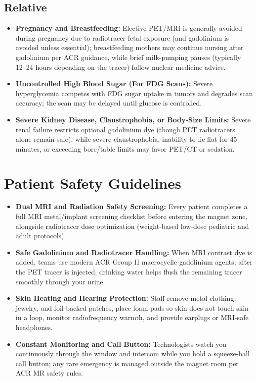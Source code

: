 \subsection{Relative}
\begin{itemize}
\item \textbf{Pregnancy and Breastfeeding:} Elective PET/MRI is generally avoided during pregnancy due to radiotracer fetal exposure (and gadolinium is avoided unless essential); breastfeeding mothers may continue nursing after gadolinium per ACR guidance, while brief milk-pumping pauses (typically 12--24 hours depending on the tracer) follow nuclear medicine advice.
\item \textbf{Uncontrolled High Blood Sugar (For FDG Scans):} Severe hyperglycemia competes with FDG sugar uptake in tumors and degrades scan accuracy; the scan may be delayed until glucose is controlled.
\item \textbf{Severe Kidney Disease, Claustrophobia, or Body-Size Limits:} Severe renal failure restricts optional gadolinium dye (though PET radiotracers alone remain safe), while severe claustrophobia, inability to lie flat for 45 minutes, or exceeding bore/table limits may favor PET/CT or sedation.
\end{itemize}

\section{Patient Safety Guidelines}
\begin{itemize}
\item \textbf{Dual MRI and Radiation Safety Screening:} Every patient completes a full MRI metal/implant screening checklist before entering the magnet zone, alongside radiotracer dose optimization (weight-based low-dose pediatric and adult protocols).
\item \textbf{Safe Gadolinium and Radiotracer Handling:} When MRI contrast dye is added, teams use modern ACR Group II macrocyclic gadolinium agents; after the PET tracer is injected, drinking water helps flush the remaining tracer smoothly through your urine.
\item \textbf{Skin Heating and Hearing Protection:} Staff remove metal clothing, jewelry, and foil-backed patches, place foam pads so skin does not touch skin in a loop, monitor radiofrequency warmth, and provide earplugs or MRI-safe headphones.
\item \textbf{Constant Monitoring and Call Button:} Technologists watch you continuously through the window and intercom while you hold a squeeze-ball call button; any rare emergency is managed outside the magnet room per ACR MR safety rules.
\end{itemize}

